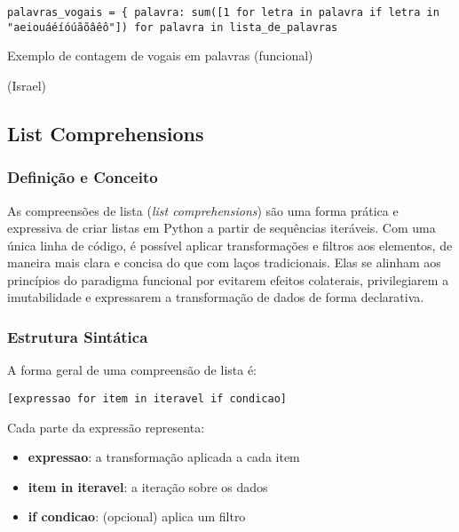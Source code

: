 \documentclass[date,twocolumn,a4paper]{ppgem}
\begin{document}


\begin{listing}[!ht]
\begin{verbatim}
palavras_vogais = { palavra: sum([1 for letra in palavra if letra in "aeiouáéíóúãõâêô"]) for palavra in lista_de_palavras
\end{verbatim}
\caption{Exemplo de contagem de vogais em palavras (funcional)}
\label{listing:2}
\end{listing}

(Israel)
\subsection{List Comprehensions}

\subsubsection{Definição e Conceito}
As compreensões de lista (\textit{list comprehensions}) são uma forma prática e expressiva de criar listas em Python a partir de sequências iteráveis. Com uma única linha de código, é possível aplicar transformações e filtros aos elementos, de maneira mais clara e concisa do que com laços tradicionais. Elas se alinham aos princípios do paradigma funcional por evitarem efeitos colaterais, privilegiarem a imutabilidade e expressarem a transformação de dados de forma declarativa.

\subsubsection{Estrutura Sintática}
A forma geral de uma compreensão de lista é:

\begin{verbatim}
[expressao for item in iteravel if condicao]
\end{verbatim}

Cada parte da expressão representa:
\begin{itemize}
  \item \textbf{expressao}: a transformação aplicada a cada item
  \item \textbf{item in iteravel}: a iteração sobre os dados
  \item \textbf{if condicao}: (opcional) aplica um filtro
\end{itemize}
\end{document}
